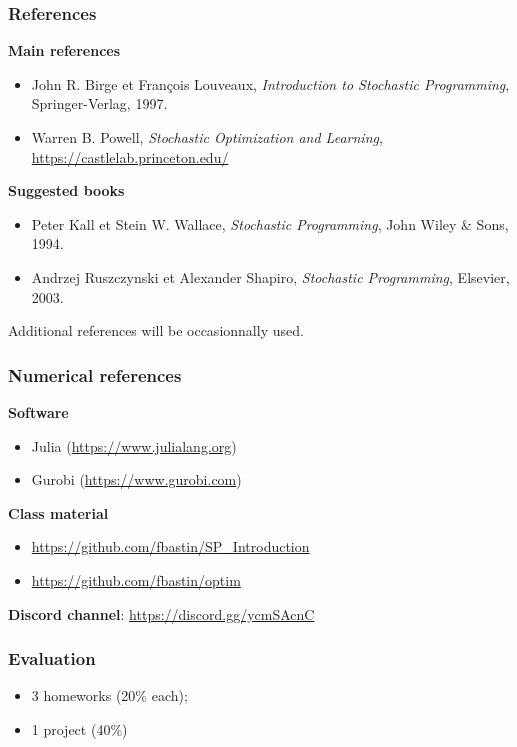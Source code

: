 \documentclass{beamer}
\begin{document}
\begin{frame}
\frametitle{References}

{\bf Main references}
\begin{itemize}
\item
John R. Birge et François Louveaux, {\sl Introduction to Stochastic
  Programming}, Springer-Verlag, 1997.
\item
Warren B. Powell, {\sl Stochastic Optimization and Learning},  \url{https://castlelab.princeton.edu/}
\end{itemize}

{\bf Suggested books}
\begin{itemize}
\item
Peter Kall et Stein W. Wallace, {\sl Stochastic Programming}, John
  Wiley \& Sons, 1994.
\item
Andrzej Ruszczynski et Alexander Shapiro, {\sl Stochastic
  Programming}, Elsevier, 2003.
\end{itemize}

Additional references will be occasionnally used.

\end{frame}

\begin{frame}
\frametitle{Numerical references}

{\bf Software}
\begin{itemize}
\item
Julia (\url{https://www.julialang.org})
\item
Gurobi (\url{https://www.gurobi.com})
\end{itemize}

\mbox{}

{\bf Class material}
\begin{itemize}
	\item
	\url{https://github.com/fbastin/SP_Introduction}
	\item
\url{https://github.com/fbastin/optim}
\end{itemize}

\mbox{}

{\bf Discord channel}: \url{https://discord.gg/ycmSAcnC}

\end{frame}

\begin{frame}
\frametitle{Evaluation}

\begin{itemize}
\item
3 homeworks (20\% each);
\item
1 project (40\%)
\end{itemize}

\end{frame}
\end{document}
